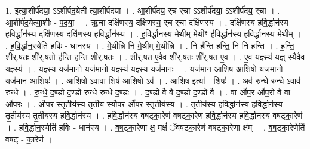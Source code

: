 \documentclass[17pt]{extarticle}
\begin{document}
1. इत्या॒शीर्प॑दया॒ ऽऽशीर्प॑द॒येती त्या॒शीर्प॑दया । . आ॒शीर्प॑दय॒ र्‌च र्‌चा ऽऽशीर्प॑दया॒ ऽऽशीर्प॑दय॒ र्‌चा । . आ॒शीर्प॑द॒येत्या॒शीः - प॒द॒या॒ । . ऋ॒चा दक्षि॑णस्य॒ दक्षि॑णस्य॒ र्‌च र्‌चा दक्षि॑णस्य । . दक्षि॑णस्य हवि॒र्द्धान॑स्य हवि॒र्द्धान॑स्य॒ दक्षि॑णस्य॒ दक्षि॑णस्य हवि॒र्द्धान॑स्य । . ह॒वि॒र्द्धान॑स्य मे॒थीम् मे॒थीꣳ ह॑वि॒र्द्धान॑स्य हवि॒र्द्धान॑स्य मे॒थीम् । . ह॒वि॒र्द्धान॒स्येति॑ हविः - धान॑स्य । . मे॒थीन्नि नि मे॒थीम् मे॒थीन्नि । . नि ह॑न्ति हन्ति॒ नि नि ह॑न्ति । . ह॒न्ति॒ शी॒र्॒.ष॒तः शी॑र्.ष॒तो ह॑न्ति हन्ति शीर्.ष॒तः । . शी॒र्॒.ष॒त ए॒वैव शी॑र्.ष॒तः शी॑र्.ष॒त ए॒व । . ए॒व य॒ज्ञ्स्य॑ य॒ज्ञ् स्यै॒वैव य॒ज्ञ्स्य॑ । . य॒ज्ञ्स्य॒ यज॑मानो॒ यज॑मानो य॒ज्ञ्स्य॑ य॒ज्ञ्स्य॒ यज॑मानः । . यज॑मान आ॒शिष॑ आ॒शिषो॒ यज॑मानो॒ यज॑मान आ॒शिषः॑ । . आ॒शिषो ऽवावा॒ शिष॑ आ॒शिषो ऽव॑ । . आ॒शिष॒ इत्या᳚ - शिषः॑ । . अव॑ रुन्धे रु॒न्धे ऽवाव॑ रुन्धे । . रु॒न्धे॒ द॒ण्डो द॒ण्डो रु॑न्धे रुन्धे द॒ण्डः । . द॒ण्डो वै वै द॒ण्डो द॒ण्डो वै । . वा औ॑प॒र औ॑प॒रो वै वा औ॑प॒रः । . औ॒प॒र स्तृ॒तीय॑स्य तृ॒तीय॑ स्यौप॒र औ॑प॒र स्तृ॒तीय॑स्य । . तृ॒तीय॑स्य हवि॒र्द्धान॑स्य हवि॒र्द्धान॑स्य तृ॒तीय॑स्य तृ॒तीय॑स्य हवि॒र्द्धान॑स्य । . ह॒वि॒र्द्धान॑स्य वषट्का॒रेण॑ वषट्का॒रेण॑ हवि॒र्द्धान॑स्य हवि॒र्द्धान॑स्य वषट्का॒रेण॑ । . ह॒वि॒र्द्धान॒स्येति॑ हविः - धान॑स्य । . व॒ष॒ट्का॒रेणा क्ष॒ मक्षं॑ ॅवषट्का॒रेण॑ वषट्का॒रेणा क्ष᳚म् । . व॒ष॒ट्का॒रेणेति॑ वषट् - का॒रेण॑ । \newline
\end{document}
